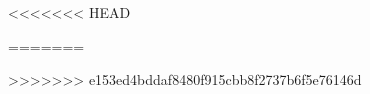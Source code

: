 \maketitle





%



%
%

\printbibliography{}

\appendix
%

<<<<<<< HEAD

=======

>>>>>>> e153ed4bddaf8480f915cbb8f2737b6f5e76146d
%
%

